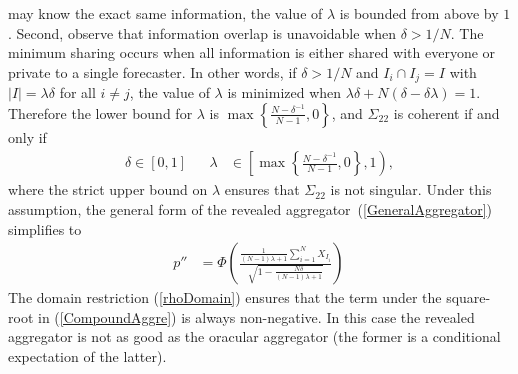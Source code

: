 \documentclass[11pt]{article}
\theoremstyle{definition}
\theoremstyle{definition}
\begin{document}
may know the exact same information, the value of $\lambda$ is 
bounded from above by $1$. Second, observe that information overlap 
is unavoidable when $\delta > 1/N$.  The minimum sharing occurs when 
all information is either shared with everyone or private to a single forecaster.  In other words, 
if $\delta > 1/N$ and $I_{i} \cap I_j = I$ with $|I| =  \lambda \delta$ 
for all $i \neq j$, the value of $\lambda$ is minimized when 
$\lambda\delta + N(\delta - \delta\lambda) = 1$.  Therefore the 
lower bound for $\lambda$ is $\max \left\{ \frac{N-\delta^{-1}}{N-1}, 
0\right\}$, and $\Sigma_{22}$ is coherent if and only if
\begin{align}
\delta \in [0,1] &&  \lambda &\in \left[  
   \max \left\{ \frac{N-\delta^{-1}}{N-1}, 0\right\}, 1 \right), 
   \label{rhoDomain}
\end{align}
where the strict upper bound on $\lambda$ ensures that
$\Sigma_{22}$ is not singular.  
Under this assumption, the general form of the revealed aggregator~(\ref{GeneralAggregator}) 
simplifies to
\begin{align}
p''
  &=\Phi\left(\frac{\frac{1}{(N-1)\lambda +1} 
  \sum_{i=1}^N X_{I_i} }{\sqrt{1- \frac{N\delta}{(N-1)\lambda +1} }}  
  \right) \, \label{CompoundAggre}
\end{align}
The domain restriction (\ref{rhoDomain}) 
ensures that the term under the square-root in (\ref{CompoundAggre}) 
is always non-negative. In this case the revealed aggregator is not
as good as the oracular aggregator (the former is a conditional
expectation of the latter). 
\end{document}
